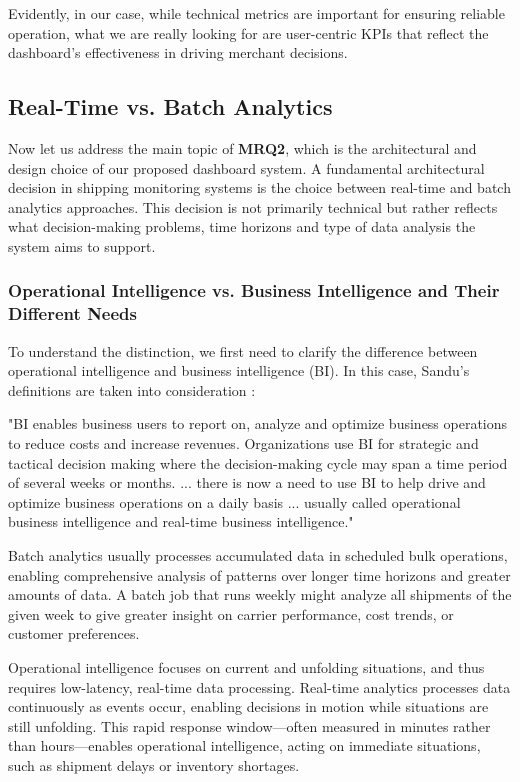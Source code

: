 \documentclass{imc-inf}
\begin{document}
Evidently, in our case, while technical metrics are important for ensuring reliable operation, what we are really looking for are user-centric KPIs that reflect the dashboard's effectiveness in driving merchant decisions.

\subsection{Real-Time vs. Batch Analytics}
\label{sec:real-time-vs-batch-analytics}
Now let us address the main topic of \textbf{MRQ2}, which is the architectural and design choice of our proposed dashboard system.
A fundamental architectural decision in shipping monitoring systems is the choice between real-time and batch analytics approaches.
This decision is not primarily technical but rather reflects what decision-making problems, time horizons and type of data analysis the system aims to support.

\subsubsection{Operational Intelligence vs. Business Intelligence and Their Different Needs}
To understand the distinction, we first need to clarify the difference between operational intelligence and business intelligence (BI).
In this case, Sandu's definitions are taken into consideration \cite{sanduOperationalRealtimeBusiness2008}:

\begin{displayquote}
  "BI enables business users to report on, analyze and optimize business operations to reduce costs and increase revenues. Organizations use BI for strategic and tactical decision making where the decision-making cycle may span a time period of several weeks or months.
  ... there is now a need to use BI to help drive and optimize business operations on a daily basis ...  usually called operational business intelligence and real-time business intelligence." \parencite{sanduOperationalRealtimeBusiness2008}
\end{displayquote}

Batch analytics usually processes accumulated data in scheduled bulk operations, enabling comprehensive analysis of patterns over longer time horizons and greater amounts of data.
A batch job that runs weekly might analyze all shipments of the given week to give greater insight on carrier performance, cost trends, or customer preferences.

Operational intelligence focuses on current and unfolding situations, and thus requires low-latency, real-time data processing.
Real-time analytics processes data continuously as events occur, enabling decisions in motion while situations are still unfolding.
This rapid response window—often measured in minutes rather than hours—enables operational intelligence, acting on immediate situations, such as shipment delays or inventory shortages.
\end{document}
